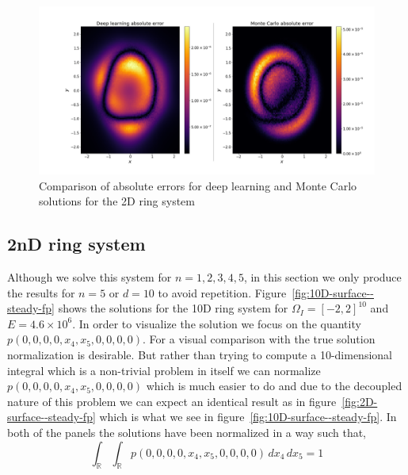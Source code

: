 \begin{figure}[!ht]
    \centering
\includegraphics[scale=0.32]{steady-fp/plots/2D-error.png}
\caption{Comparison of absolute errors for deep learning and Monte Carlo solutions for the 2D ring system}
    \label{fig:MC-comparison--steady-fp}
\end{figure}

\subsection{2nD ring system}
Although we solve this system for $n=1,2,3,4,5$, in this section we only produce the results for $n=5$ or $d=10$ to avoid repetition. Figure~\ref{fig:10D-surface--steady-fp} shows the solutions for  the 10D ring system for $\Omega_I=[-2, 2]^{10}$ and $E=4.6\times10^6$. In order to visualize the solution we focus on the quantity
$
    p(0, 0, 0, 0, x_4, x_5, 0, 0, 0, 0)
$.
For a visual comparison with the true solution normalization is desirable. But rather than trying to compute a 10-dimensional integral which is a non-trivial problem in itself we can normalize $
    p(0, 0, 0, 0, x_4, x_5, 0, 0, 0, 0)
$ which is much easier to do and due to the decoupled nature of this problem we can expect an identical result as in figure~\ref{fig:2D-surface--steady-fp} which is what we see in figure~\ref{fig:10D-surface--steady-fp}. In both of the panels the solutions have been normalized in a way such that,
$$\int_{\mathbb R}\int_{\mathbb R}p(0, 0, 0, 0, x_4, x_5, 0, 0, 0, 0)\,dx_4\,dx_5=1$$

